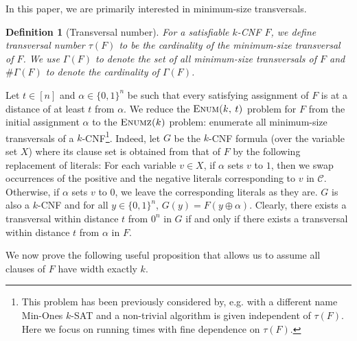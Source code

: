 \documentclass[10pt,a4paper]{article}
\newtheorem{definition}{Definition}
\newcommand{\zo}{\{0,1\}}
\newcommand{\cC}{\mathcal{C}}
\newcommand{\trn}{\tau}
\newcommand{\ntrn}{\#\Gamma}
\newcommand{\trans}{\Gamma}
\newcommand\enumballsat[2]{\textsc{Enum($#1$, $#2$)}}
\newcommand\enumz[1]{\textsc{Enumz($#1$)}}
\begin{document}
In this paper, we are primarily interested in 
minimum-size transversals.

\begin{definition}[Transversal number]
For a satisfiable $k$-CNF $F$, we define \emph{transversal number} $\trn(F)$ to be the cardinality of the minimum-size transversal of $F$.  
We use $\trans(F)$ to denote the set of all minimum-size
transversals of $F$
and $\ntrn(F)$ to denote the cardinality of 
$\trans(F)$.
\end{definition}


Let $t\in [n]$ and $\alpha\in \zo^n$ be such 
that every satisfying assignment of $F$ is at a distance
of at least $t$ from $\alpha$. 
We reduce the $\enumballsat{k}{t}$  problem for $F$
from the initial assignment $\alpha$
to the $\enumz{k}$  problem:
enumerate all 
minimum-size transversals of a $k$-CNF\footnote{This problem has been previously considered by, e.g. \cite{FominGLS19} with a different name {\sc Min-Ones $k$-SAT} and a non-trivial algorithm is given independent of $\trn(F)$. Here we focus on running times with fine dependence on $\trn(F)$.}.
Indeed, let $G$ be the $k$-CNF formula (over 
the variable set $X$) where its
clause set is obtained from that of
$F$ by the following replacement of literals:  
For each variable $v\in X$, if $\alpha$ sets $v$ to $1$, 
then we swap occurrences of the positive and the negative 
literals corresponding to $v$ in $\cC$. 
Otherwise, if $\alpha$ sets $v$ to $0$,  we leave the corresponding literals
as they are.
$G$ is also a $k$-CNF and 
for all $y\in \zo^n$, $G(y) = F(y\oplus \alpha)$. Clearly, 
there exists a transversal within distance $t$ 
from $0^n$ in $G$ if and only if there exists a transversal 
within distance $t$ from $\alpha$ in $F$. 

We now prove the following useful proposition that
allows us to assume all clauses of $F$ have width exactly $k$.
\end{document}

